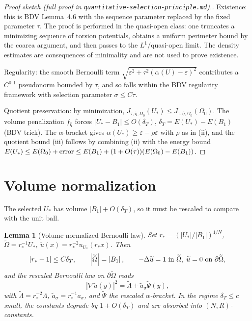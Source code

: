 \documentclass[11pt]{article}
\newtheorem{lemma}[theorem]{Lemma}
\theoremstyle{definition}
\newcommand{\abs}[1]{\left|#1\right|}
\begin{document}
\begin{proof}[Proof sketch (full proof in \texttt{quantitative-selection-principle.md}).]
Existence: this is BDV Lemma~4.6 with the sequence parameter replaced by the
fixed parameter $\tau$. The proof is performed in the quasi-open class:
one truncates a minimizing sequence of torsion potentials, obtains a uniform
perimeter bound by the coarea argument, and then passes to the $L^1$/quasi-open
limit. The density estimates are consequences of minimality and are not used
to prove existence.

Regularity: the smooth Bernoulli term
$\sqrt{\varepsilon^2+\tau^2(\alpha(U)-\varepsilon)^2}$
contributes a $C^{0,1}$ pseudonorm bounded by $\tau$, and so falls within
the BDV regularity framework with selection parameter $\sigma\le C\tau$.

Quotient preservation: by minimization, $J_{\tau,\hat\eta,\Omega_0}(U_*)\le
J_{\tau,\hat\eta,\Omega_0}(\Omega_0)$. The volume penalization $f_{\hat\eta}$
forces $\abs{U_*-B_1}\le O(\delta_T)$, $\delta_T=E(U_*)-E(B_1)$ (BDV trick).
The $\alpha$-bracket gives
$\alpha(U_*)\ge\varepsilon-\rho\varepsilon$ with $\rho$ as in (ii), and the
quotient bound (iii) follows by combining (ii) with the energy bound
$E(U_*)\le E(\Omega_0)+\hbox{error}\le E(B_1)+(1+O(\tau))(E(\Omega_0)-E(B_1))$.
\end{proof}

\section{Volume normalization}\label{sec:volnorm}

The selected $U_*$ has volume $\abs{B_1}+O(\delta_T)$, so it must be
rescaled to compare with the unit ball.

\begin{lemma}[Volume-normalized Bernoulli law]\label{lem:rescale}
Set $r_*=(\abs{U_*}/\abs{B_1})^{1/N}$, $\widetilde\Omega=r_*^{-1}U_*$,
$\widetilde u(x)=r_*^{-2}u_{U_*}(r_*x)$. Then
\[
\abs{r_*-1}\le C\delta_T,\qquad
\abs{\widetilde\Omega}=\abs{B_1},\qquad
-\Delta\widetilde u=1\hbox{ in }\widetilde\Omega,\;\widetilde u=0\hbox{ on }\partial\widetilde\Omega,
\]
and the rescaled Bernoulli law on $\partial\widetilde\Omega$ reads
\[
\abs{\nabla\widetilde u(y)}^2=\widetilde\Lambda+\widetilde a_\sigma\widetilde\Psi(y),
\]
with $\widetilde\Lambda=r_*^{-2}\Lambda$, $\widetilde a_\sigma=r_*^{-1}a_\sigma$,
and $\widetilde\Psi$ the rescaled $\alpha$-bracket. In the regime
$\delta_T\le c$ small, the constants degrade by $1+O(\delta_T)$ and are
absorbed into $(N,R)$-constants.
\end{lemma}
\end{document}
